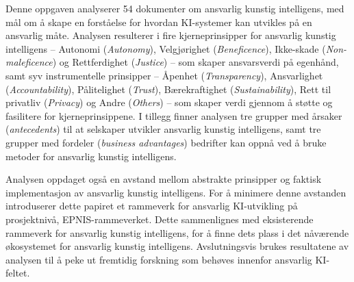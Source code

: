 Denne oppgaven analyserer 54 dokumenter om ansvarlig kunstig intelligens, med mål om å skape en forståelse for hvordan KI-systemer kan utvikles på en ansvarlig måte. Analysen resulterer i fire kjerneprinsipper for ansvarlig kunstig intelligens -- Autonomi (\textit{Autonomy}), Velgjørighet (\textit{Beneficence}), Ikke-skade (\textit{Non-maleficence}) og Rettferdighet (\textit{Justice}) -- som skaper ansvarsverdi på egenhånd, samt syv instrumentelle prinsipper -- Åpenhet (\textit{Transparency}), Ansvarlighet (\textit{Accountability}), Pålitelighet (\textit{Trust}), Bærekraftighet (\textit{Sustainability}), Rett til privatliv (\textit{Privacy}) og Andre (\textit{Others}) -- som skaper verdi gjennom å støtte og fasilitere for kjerneprinsippene. I tillegg finner analysen tre grupper med årsaker (\textit{antecedents}) til at selskaper utvikler ansvarlig kunstig intelligens, samt tre grupper med fordeler (\textit{business advantages}) bedrifter kan oppnå ved å bruke metoder for ansvarlig kunstig intelligens.

Analysen oppdaget også en avstand mellom abstrakte prinsipper og faktisk implementasjon av ansvarlig kunstig intelligens. For å minimere denne avstanden introduserer dette papiret et rammeverk for ansvarlig KI-utvikling på prosjektnivå, EPNIS-rammeverket. Dette sammenlignes med eksisterende rammeverk for ansvarlig kunstig intelligens, for å finne dets plass i det nåværende økosystemet for ansvarlig kunstig intelligens. Avslutningsvis brukes resultatene av analysen til å peke ut fremtidig forskning som behøves innenfor ansvarlig KI-feltet.

\newpage